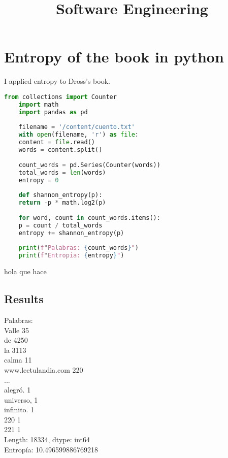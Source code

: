 \documentclass[a4,10pt]{article}
\title{Software Engineering}
\begin{document}
\section{Entropy of the book in python}

I applied entropy to Dross's book.

\begin{lstlisting}[language=Python]
	from collections import Counter
	import math
	import pandas as pd
	
	filename = '/content/cuento.txt'
	with open(filename, 'r') as file:
	content = file.read()
	words = content.split()
	
	count_words = pd.Series(Counter(words))
	total_words = len(words)
	entropy = 0
	
	def shannon_entropy(p):
	return -p * math.log2(p)
	
	for word, count in count_words.items():
	p = count / total_words
	entropy += shannon_entropy(p)
	
	print(f"Palabras: {count_words}")
	print(f"Entropia: {entropy}")

\end{lstlisting}

hola que hace


\subsection{Results}

Palabras: \\
Valle          35 \\
de                     4250 \\
la                     3113 \\
calma                    11 \\
www.lectulandia.com     220 \\
... 						\\
alegró.                   1 \\
universo,                 1 \\
infinito.                 1 \\
220                       1 \\
221                       1 \\
Length: 18334, dtype: int64 \\
Entropía: 10.496599886769218 \\


\printbibliography
\end{document}
